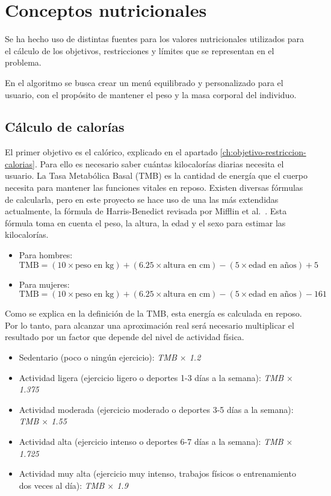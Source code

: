 \section{Conceptos nutricionales}

Se ha hecho uso de distintas fuentes para los valores nutricionales utilizados para el cálculo de los objetivos, restricciones y límites que se representan en el problema.

En el algoritmo se busca crear un menú equilibrado y personalizado para el usuario, con el propósito de mantener el peso y la masa corporal del individuo.

\subsection{Cálculo de calorías}
\label{ch:calculo-calorias}

El primer objetivo es el calórico, explicado en el apartado \ref{ch:objetivo-restriccion-calorias}. Para ello es necesario saber cuántas kilocalorías diarias necesita el usuario. La Tasa Metabólica Basal (TMB) es la cantidad de energía que el cuerpo necesita para mantener las funciones vitales en reposo. Existen diversas fórmulas de calcularla, pero en este proyecto se hace uso de una las más extendidas actualmente, la fórmula de Harris-Benedict revisada por Mifflin et al.~\cite{mifflin1990}. Esta fórmula toma en cuenta el peso, la altura, la edad y el sexo para estimar las kilocalorías.

\begin{itemize}
    \item Para hombres:
    \[
    \text{TMB} = (10 \times \text{peso en kg}) + (6.25 \times \text{altura en cm}) - (5 \times \text{edad en años}) + 5
    \]
    \item Para mujeres:
    \[
    \text{TMB} = (10 \times \text{peso en kg}) + (6.25 \times \text{altura en cm}) - (5 \times \text{edad en años}) - 161
    \]
\end{itemize}

Como se explica en la definición de la TMB, esta energía es calculada en reposo. Por lo tanto, para alcanzar una aproximación real será necesario multiplicar el resultado por un factor que depende del nivel de actividad física.~\cite{krause2016}

\begin{itemize}
    \item Sedentario (poco o ningún ejercicio): \textit{TMB $\times$ 1.2}
    \item Actividad ligera (ejercicio ligero o deportes 1-3 días a la semana): \textit{TMB $\times$ 1.375}
    \item Actividad moderada (ejercicio moderado o deportes 3-5 días a la semana): \textit{TMB $\times$ 1.55}
    \item Actividad alta (ejercicio intenso o deportes 6-7 días a la semana): \textit{TMB $\times$ 1.725}
    \item Actividad muy alta (ejercicio muy intenso, trabajos físicos o entrenamiento dos veces al día): \textit{TMB $\times$ 1.9}
\end{itemize}

